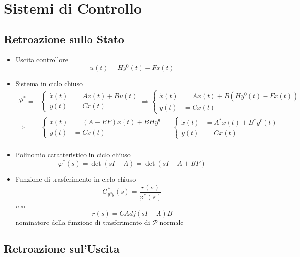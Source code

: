 \documentclass{article}
\begin{document}
\section{Sistemi di Controllo}

\subsection{Retroazione sullo Stato}

\begin{itemize}
\item Uscita controllore
  \[ u(t) = Hy^{0}(t) - Fx(t) \]
\item Sistema in ciclo chiuso
  \begin{align*}
    \mathcal{P}^{\ast} = &\begin{cases}
    \dot{x}(t) &= Ax(t) + Bu(t) \\
    y(t) &= Cx(t)
  \end{cases}
  \Rightarrow \begin{cases}
    \dot{x}(t) &= Ax(t) + B (Hy^{0}(t) - Fx(t)) \\
    y(t) &= Cx(t)
  \end{cases} \\
  \Rightarrow &\begin{cases}
    \dot{x}(t) &= (A-BF)x(t) + BHy^{0} \\
    y(t) &= Cx(t)
  \end{cases}
  = \begin{cases}
    \dot{x}(t) &= A^{\ast}x(t) + B^{\ast}y^{0}(t) \\
    y(t) &= Cx(t)
  \end{cases} \\
  \end{align*}
\item Polinomio caratteristico in ciclo chiuso
  \[ \varphi ^{\ast}(s) = \det(sI - A) = \det(sI - A + BF) \]%
\item Funzione di trasferimento in ciclo chiuso
  \[ G^{\ast}_{y^0 y} (s) = \frac{r(s)}{\varphi ^{\ast} (s)} \]
  con
  \[ r(s) = C Adj(sI-A)B \]
  nominatore della funzione di trasferimento di $\mathcal{P}$ normale
\end{itemize}

\subsection{Retroazione sul'Uscita}
\end{document}
